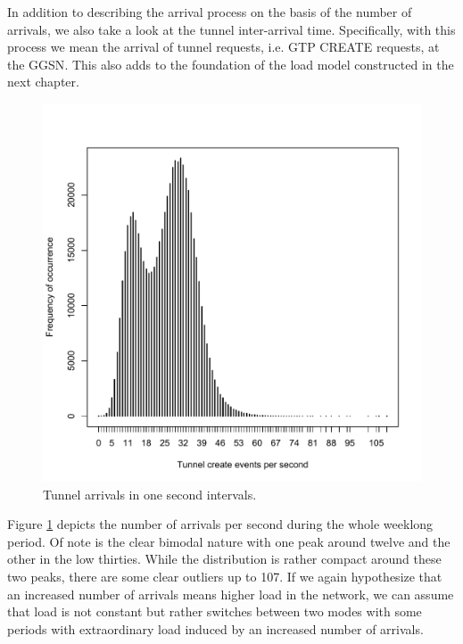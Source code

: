 In addition to describing the arrival process on the basis of the number of arrivals, we also take a look at the tunnel inter-arrival time. Specifically, with this process we mean the arrival of tunnel requests, i.e. GTP CREATE requests, at the \ac{GGSN}. This also adds to the foundation of the load model constructed in the next chapter. 

\begin{figure}
	\centering
	\includegraphics[width=\columnwidth]{images/IMC2013/create_freq.pdf}
	\caption{Tunnel arrivals in one second intervals.}
	\label{fig:freq-arrivals}
\end{figure}

Figure \ref{fig:freq-arrivals} depicts the number of arrivals per second during the whole weeklong period. Of note is the clear bimodal nature with one peak around twelve and the other in the low thirties. While the distribution is rather compact around these two peaks, there are some clear outliers up to 107.
If we again hypothesize that an increased number of arrivals means higher load in the network, we can assume that load is not constant but rather switches between two modes with some periods with extraordinary load induced by an increased number of arrivals.

